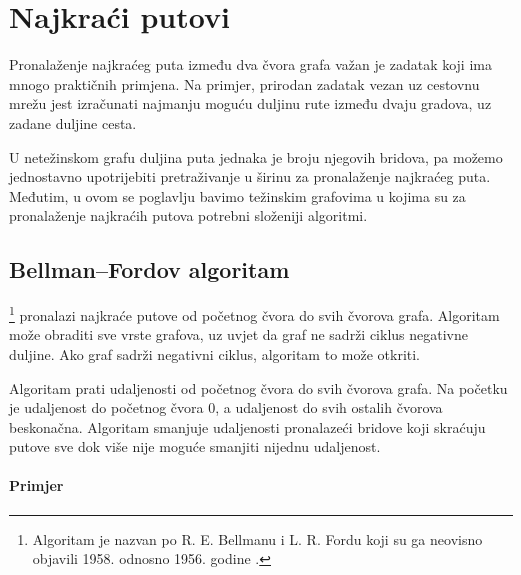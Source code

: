 \chapter{Najkraći putovi}


Pronalaženje najkraćeg puta između dva čvora
grafa
važan je zadatak koji ima mnogo
praktičnih primjena.
Na primjer, prirodan zadatak vezan uz cestovnu mrežu
jest izračunati najmanju moguću duljinu rute
između dvaju gradova, uz zadane duljine cesta.

U netežinskom grafu duljina puta jednaka je
broju njegovih bridova, pa možemo
jednostavno upotrijebiti pretraživanje u širinu za pronalaženje
najkraćeg puta.
Međutim, u ovom se poglavlju bavimo
težinskim grafovima
u kojima su za pronalaženje najkraćih putova
potrebni
složeniji algoritmi.

\section{Bellman–Fordov algoritam}


\footnote{Algoritam je nazvan po
R. E. Bellmanu i L. R. Fordu koji su ga neovisno objavili
1958. odnosno 1956. godine \cite{bel58,for56a}.} pronalazi
najkraće putove od početnog čvora do svih
čvorova grafa.
Algoritam može obraditi sve vrste grafova,
uz uvjet da graf ne sadrži
ciklus negativne duljine.
Ako graf sadrži negativni ciklus,
algoritam to može otkriti.

Algoritam prati udaljenosti
od početnog čvora do svih čvorova grafa.
Na početku je udaljenost do početnog čvora 0,
a udaljenost do svih ostalih čvorova beskonačna.
Algoritam smanjuje udaljenosti pronalazeći
bridove koji skraćuju putove sve dok više nije
moguće smanjiti nijednu udaljenost.

\subsubsection{Primjer}

